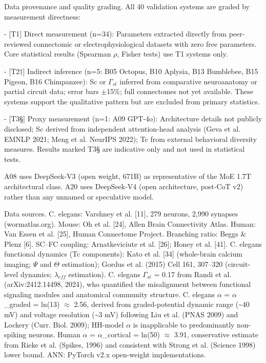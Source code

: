 \documentclass[a4paper,12pt]{article}
\begin{document}
Data provenance and quality grading. All 40 validation systems are graded by measurement directness:


- [T1] Direct measurement (n=34): Parameters extracted directly from peer-reviewed connectomic or electrophysiological datasets with zero free parameters. Core statistical results (Spearman $\rho$, Fisher tests) use T1 systems only.


- [T2†] Indirect inference (n=5: B05 Octopus, B10 Aplysia, B13 Bumblebee, B15 Pigeon, B16 Chimpanzee): Sc or $\Gamma_{st}$ inferred from comparative neuroanatomy or partial circuit data; error bars $\pm$15\%; full connectomes not yet available. These systems support the qualitative pattern but are excluded from primary statistics.


- [T3§] Proxy measurement (n=1: A09 GPT-4o): Architecture details not publicly disclosed; Sc derived from independent attention-head analysis (Geva et al. EMNLP 2021; Meng et al. NeurIPS 2022); Tc from external behavioral diversity measures. Results marked T3§ are indicative only and not used in statistical tests.


A08 uses DeepSeek-V3 (open weight, 671B) as representative of the MoE 1.7T architectural class. A20 uses DeepSeek-V4 (open architecture, post-CoT v2) rather than any unnamed or speculative model.


Data sources. C. elegans: Varshney et al. [11], 279 neurons, 2,990 synapses (wormatlas.org). Mouse: Oh et al. [24], Allen Brain Connectivity Atlas. Human: Van Essen et al. [25], Human Connectome Project. Branching ratio: Beggs \& Plenz [6]. SC--FC coupling: Arnatkeviciute et al. [26]; Honey et al. [41]. C. elegans functional dynamics (Tc components): Kato et al. [34] (whole-brain calcium imaging; $\Psi$ and $\Theta$ estimation); Gordus et al. (2015) Cell 161, 307--320 (circuit-level dynamics; $\lambda_{eff}$ estimation). C. elegans $\Gamma_{st}$ = 0.17 from Randi et al. (arXiv:2412.14498, 2024), who quantified the misalignment between functional signaling modules and anatomical community structure. C. elegans $\alpha$ = $\alpha$_graded = ln(13) $\approx$ 2.56, derived from graded-potential dynamic range (\textasciitilde{}40 mV) and voltage resolution (\textasciitilde{}3 mV) following Liu et al. (PNAS 2009) and Lockery (Curr. Biol. 2009); HH-model $\alpha$ is inapplicable to predominantly non-spiking neurons. Human $\alpha$ = $\alpha$_cortical = ln(50) $\approx$ 3.91, conservative estimate from Rieke et al. (Spikes, 1996) and consistent with Strong et al. (Science 1998) lower bound. ANN: PyTorch v2.x open-weight implementations.
\end{document}
